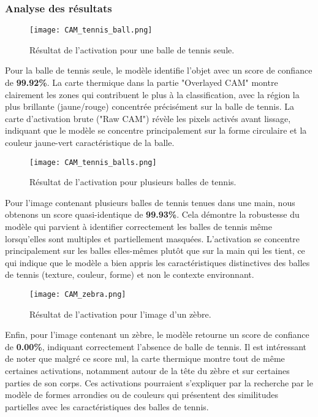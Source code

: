 \documentclass{article}
\begin{document}
\subsubsection{Analyse des résultats}
\begin{figure}[H]
    \centering
    \texttt{[image: CAM\_tennis\_ball.png]}
    \caption{Résultat de l'activation pour une balle de tennis seule.}
\end{figure}
Pour la balle de tennis seule, le modèle identifie l'objet avec un score de confiance de \textbf{99.92\%}. La carte thermique dans la partie "Overlayed CAM" montre clairement les zones qui contribuent le plus à la classification, avec la région la plus brillante (jaune/rouge) concentrée précisément sur la balle de tennis. La carte d'activation brute ("Raw CAM") révèle les pixels activés avant lissage, indiquant que le modèle se concentre principalement sur la forme circulaire et la couleur jaune-vert caractéristique de la balle.

\begin{figure}[H]
    \centering
    \texttt{[image: CAM\_tennis\_balls.png]}
    \caption{Résultat de l'activation pour plusieurs balles de tennis.}
\end{figure}
Pour l'image contenant plusieurs balles de tennis tenues dans une main, nous obtenons un score quasi-identique de \textbf{99.93\%}. Cela démontre la robustesse du modèle qui parvient à identifier correctement les balles de tennis même lorsqu'elles sont multiples et partiellement masquées. L'activation se concentre principalement sur les balles elles-mêmes plutôt que sur la main qui les tient, ce qui indique que le modèle a bien appris les caractéristiques distinctives des balles de tennis (texture, couleur, forme) et non le contexte environnant.

\begin{figure}[H]
    \centering
    \texttt{[image: CAM\_zebra.png]}
    \caption{Résultat de l'activation pour l'image d'un zèbre.}
\end{figure}
Enfin, pour l'image contenant un zèbre, le modèle retourne un score de confiance de \textbf{0.00\%}, indiquant correctement l'absence de balle de tennis. Il est intéressant de noter que malgré ce score nul, la carte thermique montre tout de même certaines activations, notamment autour de la tête du zèbre et sur certaines parties de son corps. Ces activations pourraient s'expliquer par la recherche par le modèle de formes arrondies ou de couleurs qui présentent des similitudes partielles avec les caractéristiques des balles de tennis.
\end{document}
